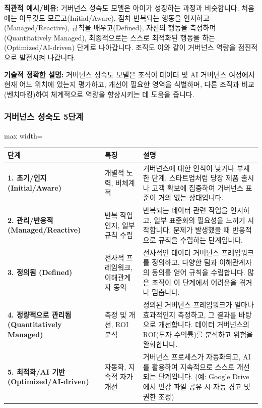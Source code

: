 \documentclass[11pt,a4paper]{article}
\begin{document}
\textbf{직관적 예시/비유:}
거버넌스 성숙도 모델은 아이가 성장하는 과정과 비슷합니다. 처음에는 아무것도 모르고(Initial/Aware), 점차 반복되는 행동을 인지하고(Managed/Reactive), 규칙을 배우고(Defined), 자신의 행동을 측정하며(Quantitatively Managed), 최종적으로는 스스로 최적화된 행동을 하는(Optimized/AI-driven) 단계로 나아갑니다. 조직도 이와 같이 거버넌스 역량을 점진적으로 발전시켜 나갑니다.

\textbf{기술적 정확한 설명:}
거버넌스 성숙도 모델은 조직이 데이터 및 AI 거버넌스 여정에서 현재 어느 위치에 있는지 평가하고, 개선이 필요한 영역을 식별하며, 다른 조직과 비교(벤치마킹)하여 체계적으로 역량을 향상시키는 데 도움을 줍니다.

\subsubsection*{거버넌스 성숙도 5단계}
\begin{adjustbox}{max width=\textwidth}
\begin{tabular}{p{}p{}p{}}
\toprule
\textbf{단계} & \textbf{특징} & \textbf{설명} \\
\midrule
\textbf{1. 초기/인지 (Initial/Aware)} & 개별적 노력, 비체계적 & 거버넌스에 대한 인식이 낮거나 부재한 단계. 스타트업처럼 당장 제품 출시나 고객 확보에 집중하여 거버넌스 표준이 거의 없는 상태입니다. \\
\textbf{2. 관리/반응적 (Managed/Reactive)} & 반복 작업 인지, 일부 규칙 수립 & 반복되는 데이터 관련 작업을 인지하고, 일부 표준화의 필요성을 느끼기 시작합니다. 문제가 발생했을 때 반응적으로 규칙을 수립하는 단계입니다. \\
\textbf{3. 정의됨 (Defined)} & 전사적 프레임워크, 이해관계자 동의 & 전사적인 데이터 거버넌스 프레임워크를 정의하고, 다양한 팀과 이해관계자의 동의를 얻어 규칙을 수립합니다. 많은 조직이 이 단계에서 어려움을 겪거나 멈춥니다. \\
\textbf{4. 정량적으로 관리됨 (Quantitatively Managed)} & 측정 및 개선, ROI 분석 & 정의된 거버넌스 프레임워크가 얼마나 효과적인지 측정하고, 그 결과를 바탕으로 개선합니다. 데이터 거버넌스의 ROI(투자 수익률)를 분석하고 위험을 완화합니다. \\
\textbf{5. 최적화/AI 기반 (Optimized/AI-driven)} & 자동화, 지속적 자가 개선 & 거버넌스 프로세스가 자동화되고, AI를 활용하여 지속적으로 스스로 개선되는 단계입니다. (예: Google Drive에서 민감 파일 공유 시 자동 경고 및 권한 조정) \\
\bottomrule
\end{tabular}
\end{adjustbox}
\label{tab:maturity_model}
\end{document}
